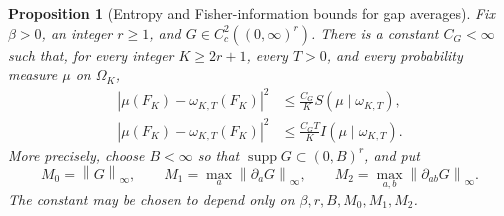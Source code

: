 \documentclass[11pt,reqno]{amsart}
\numberwithin{equation}{section}
\newtheorem{proposition}[theorem]{Proposition}
\theoremstyle{definition}
\theoremstyle{remark}
\newcommand{\1}{\mathbf 1}
\newcommand{\norm}[1]{\left\lVert #1\right\rVert}
\DeclareMathOperator{\supp}{supp}
\begin{document}
\begin{samepage}
\begin{proposition}[Entropy and Fisher-information bounds for gap averages]\label{prop:gap-entropy}
Fix $\beta>0$, an integer $r\ge1$, and $G\in C_c^2((0,\infty)^r)$.
There is a constant $C_G<\infty$ such that, for every integer
$K\ge2r+1$, every $T>0$, and every probability measure $\mu$ on
$\Omega_K$,
\begin{align}
|\mu(F_K)-\omega_{K,T}(F_K)|^2
&\le \frac{C_G}{K}S(\mu\mid\omega_{K,T}),\label{eq:entropy-gap}\\
|\mu(F_K)-\omega_{K,T}(F_K)|^2
&\le \frac{C_GT}{K}I(\mu\mid\omega_{K,T}).\label{eq:fisher-gap}
\end{align}
More precisely, choose $B<\infty$ so that
$\supp G\subset(0,B)^r$, and put
\[
M_0=\norm G_\infty,\qquad
M_1=\max_a\norm{\partial_aG}_\infty,\qquad
M_2=\max_{a,b}\norm{\partial_{ab}G}_\infty.
\]
The constant may be chosen to depend only on
$\beta,r,B,M_0,M_1,M_2$.
\end{proposition}
\end{samepage}
\end{document}
